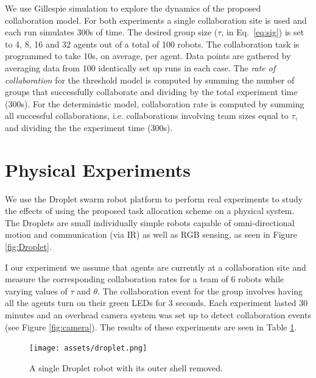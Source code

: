 \documentclass{TeXstyles/DARS/svmult}  %
\begin{document}
We use Gillespie simulation \cite{gillespie76} to explore the dynamics of the proposed collaboration model.
For both experiments a single collaboration site is used and each run simulates 300s of time. The desired group size ($\tau$, in Eq.~\eqref{eq:sig}) is set to 4, 8, 16 and 32 agents out of a total of 100 robots. The collaboration task is programmed to take 10s, on average, per agent. Data points are gathered by averaging data from 100 identically set up runs in each case. The \emph{rate of collaboration} for the threshold model is computed by summing the number of groups that successfully collaborate and dividing by the total experiment time (300s). For the deterministic model, collaboration rate is computed by summing all successful collaborations, i.e. collaborations involving team sizes equal to $\tau$, and dividing the the experiment time (300s).




\section{Physical Experiments}
We use the Droplet swarm robot platform to perform real experiments to study the effects of using the proposed task allocation scheme on a physical system. The Droplets are small individually simple robots capable of omni-directional motion and communication (via IR) as well as RGB sensing, as seen in Figure \ref{fig:Droplet}.

I our experiment we assume that agents are currently at a collaboration site and measure the corresponding collaboration rates for a team of 6 robots while varying values of $\tau$ and $\theta$. The collaboration event for the group involves having all the agents turn on their green LEDs for 3 seconds. Each experiment lasted 30 minutes and an overhead camera system was set up to detect collaboration events (see Figure \ref{fig:camera}). The results of these experiments are seen in Table \ref{tab:realexpres}.

\begin{figure}[!htb]
\centering\texttt{[image: assets/droplet.png]}
\centering\caption{A single Droplet robot with its outer shell removed.}\label{fig:droplet}
\end{figure}


\begin{table}[!htb]
\centering\begin{tabular}{|*6c}
\end{tabular}
\centering\caption{}\label{tab:realexpres}
\end{table}
\end{document}
